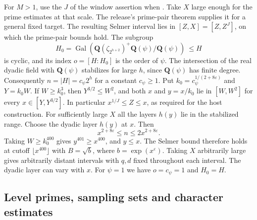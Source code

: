 For \(M>1\), use the \(J\) of the window assertion when
.
Take \(X\) large enough for the prime estimates at that scale. The
release's prime-pair theorem supplies it for a general fixed target.
The resulting Selmer interval lies in \([Z,X]=[Z,Z^J]\), on which
the prime-pair bounds hold. The subgroup
\[
 H_0=\operatorname{Gal}\!\left(
   \mathbf Q(\zeta_{2^{h+2}})^+\mathbf Q(\psi)/\mathbf Q(\psi)\right)
 \ \le H
\]
is cyclic, and its index \(o=[H:H_0]\) is the order of \(\psi\).
The intersection of the real dyadic field with \(\mathbf Q(\psi)\)
stabilizes for large \(h\), since \(\mathbf Q(\psi)\) has finite degree.
Consequently \(n=|H|=c_\psi2^h\) for a constant \(c_\psi\ge1\).
Put \(k_0=c_\psi^{1/(2+8\varepsilon)}\) and \(Y=k_0W\). If
\(W\ge k_0^3\), then \(Y^{3/2}\le W^2\), and both \(x\) and
\(y=x/k_0\) lie in \([W,W^2]\) for every \(x\in[Y,Y^{3/2}]\).
In particular \(x^{1/J}\le Z\le x\), as required for the host
construction. For sufficiently large \(X\) all the layers \(h(y)\)
lie in the stabilized range. Choose the dyadic layer \(h(y)\) at \(x\).
Then
\[
 x^{2+8\varepsilon}\le n\le2x^{2+8\varepsilon}.
\]
Taking \(W\ge k_0^{400}\) gives \(y^{401}\ge x^{400}\), and
\(y\le x\).
The Selmer bound therefore holds at cutoff \(\lfloor x^{400}\rfloor\)
with \(B=\sqrt b\), where \(b=\exp(x^\varepsilon)\).
Taking \(X\) arbitrarily large gives arbitrarily distant intervals
with \(q,d\) fixed throughout each interval. The dyadic layer can vary
with \(x\). For \(\psi=1\) we have \(o=c_\psi=1\) and \(H_0=H\).

\subsection{Level primes, sampling sets and character estimates}

